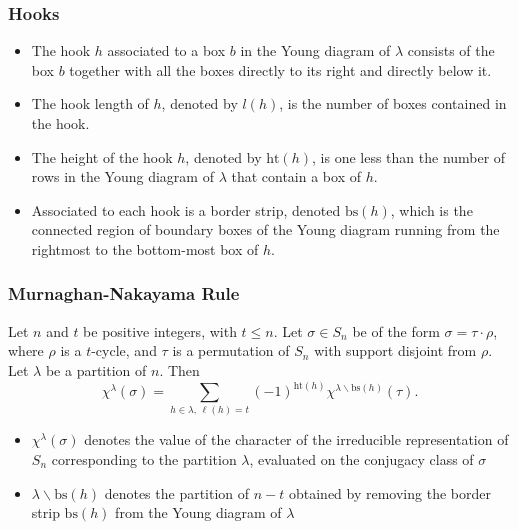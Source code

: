 \documentclass{beamer}
\begin{document}
\begin{frame}
\frametitle{Hooks}
\begin{itemize}
    \item The hook $h$ associated to a box $b$ in the Young diagram of $\lambda$ consists of the box $b$ together with all the boxes directly to its right and directly below it. 
    \item The hook length of $h$, denoted by $l(h)$, is the number of boxes contained in the hook. 
    \item The height of the hook $h$, denoted by $\text{ht}(h)$, is one less than the number of rows in the Young diagram of $\lambda$ that contain a box of $h$. 
    \item  Associated to each hook is a border strip, denoted $\text{bs}(h)$, which is the connected region of boundary boxes of the Young diagram running from the rightmost to the bottom-most box of $h$.
\end{itemize}
\centering
{}
\label{fig:younghl}
\end{frame}


\begin{frame}
\frametitle{Murnaghan-Nakayama Rule}
\begin{theorem}
Let $n$ and $t$ be positive integers, with $t \leq n$. Let $\sigma \in S_n$ be of the form $\sigma = \tau \cdot \rho$, where $\rho$ is a $t$-cycle, and $\tau$ is a permutation of $S_n$ with support disjoint from $\rho$. Let $\lambda$ be a partition of $n$. Then
\begin{equation*}
    \chi^{\lambda}(\sigma) = \sum_{h \in \lambda, \, \ell(h) = t} (-1)^{\text{ht}(h)} \chi^{\lambda \backslash \text{bs}(h)}(\tau).
\end{equation*}
\end{theorem}

\begin{itemize}
    \item $\chi^{\lambda}(\sigma)$ denotes the value of the character of the irreducible representation of $S_n$ corresponding to the partition $\lambda$, evaluated on the conjugacy class of $\sigma$
    \item $\lambda \backslash \text{bs}(h)$ denotes the partition of $n - t$ obtained by removing the border strip $\text{bs}(h)$ from the Young diagram of $\lambda$
\end{itemize}
\end{frame}
\end{document}

